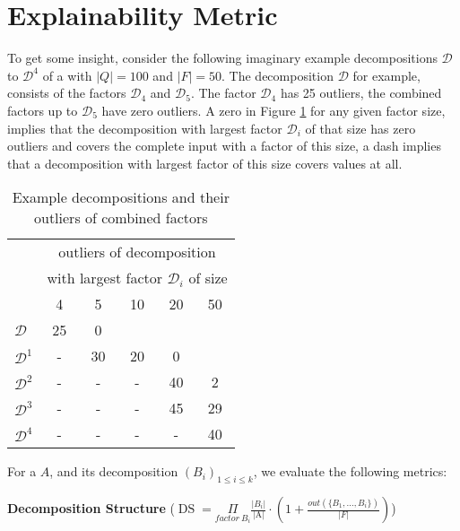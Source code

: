 \section{Explainability Metric}
\label{ch:explainability:metric}
To get some insight, consider the following imaginary example decompositions $\mathcal{D}$ to $\mathcal{D}^4$ of a \DFA with $|Q| = 100$ and $|F| = 50$.
The decomposition $\mathcal{D}$ for example, consists of the factors $\mathcal{D}_4$ and $\mathcal{D}_5$.
The factor $\mathcal{D}_4$ has 25 outliers, the combined factors up to $\mathcal{D}_5$ have zero outliers.
A zero in Figure \ref{tab:example-decompositions} for any given factor size, implies that the decomposition with largest factor $\mathcal{D}_i$ of that size has zero outliers and covers the complete input \DFA with a factor of this size, a dash implies that a decomposition with largest factor of this size covers values at all.
\begin{table}[h]
	\centering
	\begin{tabular}{l|ccccc}
		& \multicolumn{5}{c}{outliers of decomposition} \\
		& \multicolumn{5}{c}{with largest factor $\mathcal{D}_i$ of size} \\
		& 4 & 5 & 10 & 20 & 50\\
		\hline
		$\mathcal{D}$ & 25 & 0 & &  & \\		
		$\mathcal{D}^1$ & - & 30 & 20 & 0 & \\
		$\mathcal{D}^2$ & - & - & - & 40 & 2 \\
		$\mathcal{D}^3$ & - & - & - & 45 & 29 \\
		$\mathcal{D}^4$ & - & - & - & - & 40\\
	\end{tabular}
	\caption{Example decompositions and their outliers of combined factors}
	\label{tab:example-decompositions}
\end{table}
For a \DFA $A$, and its decomposition $(B_i)_{1 \leq i \leq k}$, we evaluate the following metrics:

\textbf{Decomposition Structure} ($\operatorname{DS} =  \underset{factor~ B_i}{\Pi}\frac{|B_i|}{\text{|A|}} \cdot (1 + \frac{out(\{B_1,\dots,B_i\})}{|F|})$)

